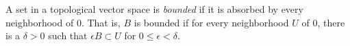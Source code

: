 \documentclass[12pt]{article}
\begin{document}
A set in a topological vector space is {\it bounded } if it is absorbed by every neighborhood of 0. That is, $B$ is bounded if for every neighborhood $U$ of 0, there
is a $\delta > 0$ such that $\epsilon B \subset U$ for $0 \leq \epsilon < \delta$.
\end{document}
